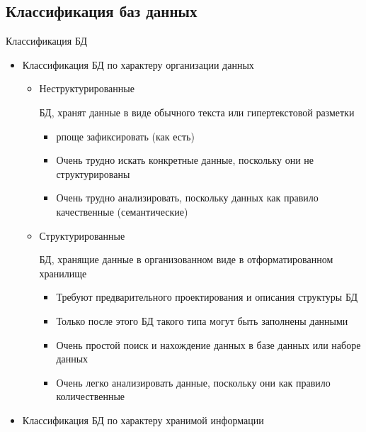 \documentclass[12pt]{article}
\begin{document}
\newpage

\subsection{Классификация баз данных}

\begin{nota}{Классификация БД}
    \begin{itemize}
        \item Классификация БД по характеру организации данных 
        
        \begin{itemize}
            \item Неструктурированные 
            
            БД, хранят данные в виде обычного текста или гипертекстовой разметки 

            \begin{itemize}
                \item рпоще зафиксировать (как есть)
                \item Очень трудно искать конкретные данные, поскольку они не структурированы 
                \item Очень трудно анализировать, поскольку данных как правило качественные (семантические)
            \end{itemize}

            \item Структурированные 
            
            БД, хранящие данные в организованном виде в отформатированном хранилище

            \begin{itemize}
                \item Требуют предварительного проектирования и описания структуры БД
                \item Только после этого БД такого типа могут быть заполнены данными 
                \item Очень простой поиск и нахождение данных в базе данных или наборе данных 
                \item Очень легко анализировать данные, поскольку они как правило количественные
            \end{itemize}
        \end{itemize}

        \item Классификация БД по характеру хранимой информации 
        

\end{itemize}
\end{nota}
\end{document}
